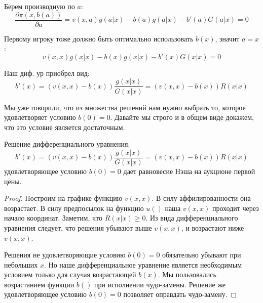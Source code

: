 \begin{itemize}
Берем производную по $ a $:
\begin{equation}
\frac{\partial \pi(x,b(a))}{\partial a}=v(x,a)g(a|x)-b(a)g(a|x)-b'(a)G(a|x)=0
\end{equation}

Первому игроку тоже должно быть оптимально использовать $ b(x) $, значит $ a=x $:
\begin{equation}
v(x,x)g(x|x)-b(x)g(x|x)-b'(x)G(x|x)=0
\end{equation}

Наш диф. ур приобрел вид:
\begin{equation}
\label{b_first_de}
b'(x)=(v(x,x)-b(x))\frac{g(x|x)}{G(x|x)}=(v(x,x)-b(x))R(x|x)
\end{equation}

Мы уже говорили, что из множества решений нам нужно выбрать то, которое удовлетворяет условию $ b(0)=0 $. Давайте мы строго и в общем виде докажем, что это условие является достаточным. 


\begin{myth}
Решение дифференциального уравнения:
\begin{equation}
b'(x)=(v(x,x)-b(x))\frac{g(x|x)}{G(x|x)}=(v(x,x)-b(x))R(x|x)
\end{equation}
удовлетворяющее условию $ b(0)=0 $ дает равновесие Нэша на аукционе первой цены.
\end{myth}

\begin{proof}


Построим на графике функцию $ v(x,x) $. В силу аффилированности она возрастает. В силу предпосылок на функцию $ u() $ наша $ v(x,x) $ проходит через начало координат. Заметим, что $ R(x|x)\geq 0 $. Из вида дифференциального уравнения следует, что решения убывают выше $ v(x,x) $, и возрастают ниже $ v(x,x) $.




Решения не удовлетворяющие условию $ b(0)=0 $ обязательно убывают при небольших $ x $. Но наше дифференциальное уравнение является необходимым условием только для случая возрастающей $ b(x) $. Мы пользовались возрастанием функции $ b() $ при исполнении чудо-замены. Решение же удовлетворяющее условию $ b(0)=0 $ позволяет оправдать чудо-замену.


\end{proof}
\end{itemize}
